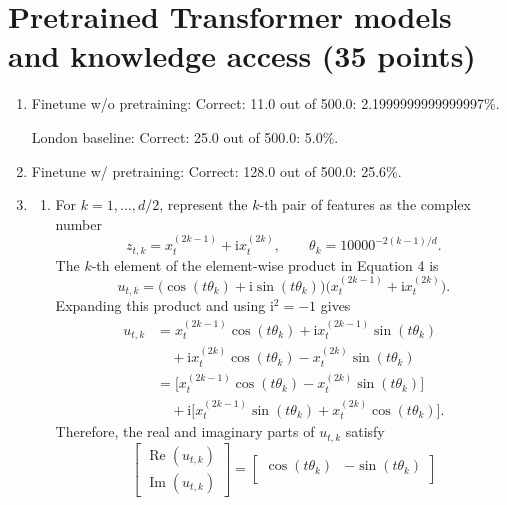 \documentclass[11pt, a4paper, oneside]{article}
\begin{document}
\section{Pretrained Transformer models and knowledge access (35 points)}
\begin{enumerate}[label=(\alph*), left=0pt, labelsep=1em, itemsep=1em]
    \item[(d)] Finetune w/o pretraining: Correct: 11.0 out of 500.0: 2.1999999999999997\%.
    
    London baseline: Correct: 25.0 out of 500.0: 5.0\%.
    \item[(f)] Finetune w/ pretraining: Correct: 128.0 out of 500.0: 25.6\%.
    \item[(g)]
    \begin{enumerate}[label=\roman*., left=0pt, labelsep=1em, itemsep=1em]
        \item
        For $k=1,\ldots,d/2$, represent the $k$-th pair of features as the
        complex number
        \[
            z_{t,k}=x_t^{(2k-1)}+\mathrm{i}x_t^{(2k)},
            \qquad
            \theta_k=10000^{-2(k-1)/d}.
        \]
        The $k$-th element of the element-wise product in Equation 4 is
        \[
            u_{t,k}
            =\bigl(\cos(t\theta_k)+\mathrm{i}\sin(t\theta_k)\bigr)
             \bigl(x_t^{(2k-1)}+\mathrm{i}x_t^{(2k)}\bigr).
        \]
        Expanding this product and using $\mathrm{i}^2=-1$ gives
        \begin{align*}
            u_{t,k}
            &=x_t^{(2k-1)}\cos(t\theta_k)
              +\mathrm{i}x_t^{(2k-1)}\sin(t\theta_k)\\
            &\quad+\mathrm{i}x_t^{(2k)}\cos(t\theta_k)
              -x_t^{(2k)}\sin(t\theta_k)\\
            &=\bigl[x_t^{(2k-1)}\cos(t\theta_k)
              -x_t^{(2k)}\sin(t\theta_k)\bigr]\\
            &\quad+\mathrm{i}\bigl[x_t^{(2k-1)}\sin(t\theta_k)
              +x_t^{(2k)}\cos(t\theta_k)\bigr].
        \end{align*}
        Therefore, the real and imaginary parts of $u_{t,k}$ satisfy
        \[
            \begin{bmatrix}
                \operatorname{Re}(u_{t,k})\\
                \operatorname{Im}(u_{t,k})
            \end{bmatrix}
            =
            \begin{bmatrix}
                \cos(t\theta_k)&-\sin(t\theta_k)\\

\end{bmatrix}\]
\end{enumerate}
\end{enumerate}
\end{document}
